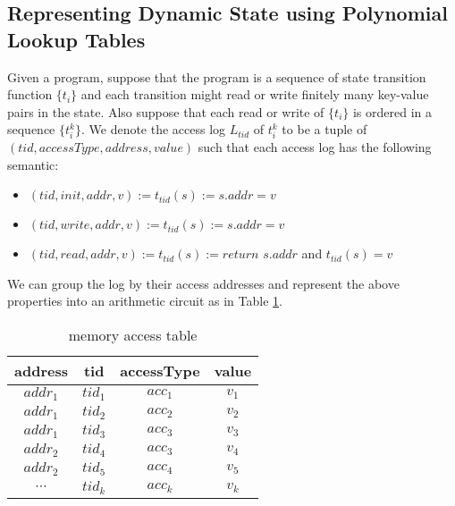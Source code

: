 \subsection{Representing Dynamic State using Polynomial Lookup Tables}
Given a program, suppose that the program is a sequence of state transition function $\{t_i\}$ and each transition might read or write finitely many key-value pairs in the state. Also suppose that each read or write of $\{t_i\}$ is ordered in a sequence $\{t_i^k\}$. We denote the access log $L_{tid}$ of $t_i^k$ to be a tuple of $(tid, accessType, address, value)$ such that each access log has the following semantic:
\begin{itemize}
    \item $(tid, init, addr, v ) := t_{tid}(s) := s.addr = v$
    \item $(tid, write, addr, v) := t_{tid}(s) := s.addr = v$
    \item $(tid, read, addr, v) := t_{tid}(s) := return \,\, s.addr$ and $t_{tid}(s) = v$
\end{itemize}
We can group the log by their access addresses and represent the above properties into an arithmetic circuit as in Table \ref{tbl:rw-table}.
\begin{table}[!h]
\begin{center}
\begin{tabular}{ | c | c | c | c | }
  \hline
  address & tid & accessType & value \\ 
  \hline
 $addr_1$ & $tid_1$ &  $acc_1$ & $v_1$ \\  
 $addr_1$ & $tid_2$ &  $acc_2$ & $v_2$ \\
  $addr_1$ & $tid_3$ &  $acc_3$ & $v_3$ \\  
 \hline
 $addr_2$ & $tid_4$ &  $acc_3$ & $v_4$ \\  
 $addr_2$ & $tid_5$ & $acc_4$ & $v_5$ \\
 \hline
 $\cdots$ & $tid_k$ & $acc_k$ & $v_k$ \\
 \hline
\end{tabular}
\caption{memory access table}
\label{tbl:rw-table}
\end{center}
\end{table}

